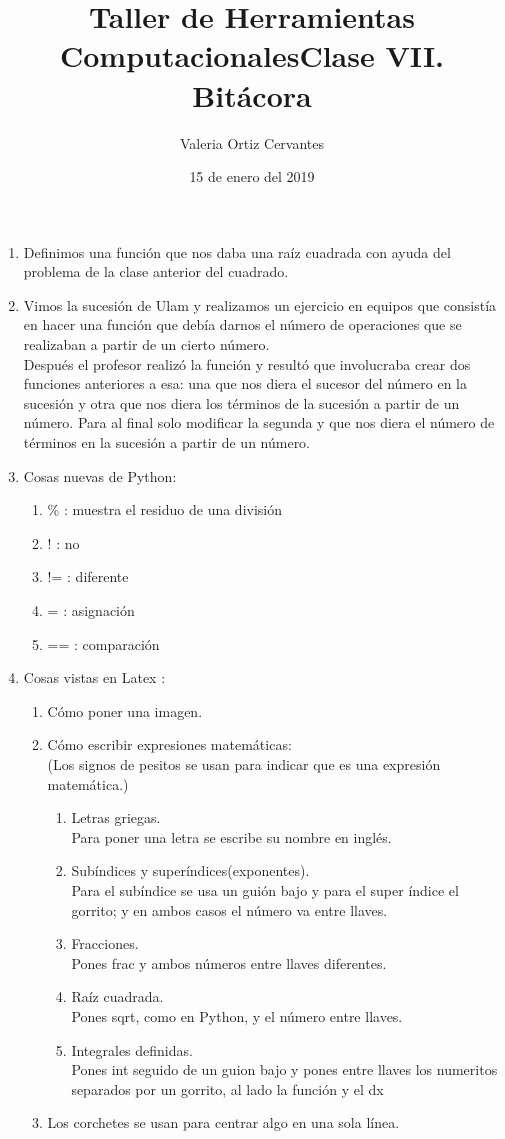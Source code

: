 \documentclass{article}
\title{\Huge Taller de Herramientas Computacionales}
\author{Valeria Ortiz Cervantes}
\date{15 de enero del 2019}
\begin{document}
	\maketitle
	\newpage
	\title{Clase VII. Bitácora\\}
	\begin{enumerate}
		\item Definimos una función que nos daba una raíz cuadrada con ayuda del problema de la clase anterior del cuadrado.
		\item Vimos la sucesión  de Ulam y realizamos un ejercicio en equipos que consistía en hacer una función que debía darnos el número de operaciones que se realizaban a partir de un cierto número. \\ Después el profesor realizó la función y resultó que involucraba crear dos funciones anteriores a esa: una que nos diera el sucesor del número en la sucesión y otra que nos diera los términos de la sucesión a partir de un número. Para al final solo modificar la segunda y que nos diera el número de términos en la sucesión a partir de un número.
		\item Cosas nuevas de Python:
		\begin{enumerate}
			\item \% : muestra el residuo de una división
			\item ! : no 
			\item != : diferente 
			\item = : asignación
			\item == : comparación 
		\end{enumerate}
		\item Cosas vistas en Latex :
		\begin{enumerate}
			\item Cómo poner una imagen.
			\item Cómo escribir expresiones matemáticas:\\(Los signos de pesitos se usan para indicar que es una expresión matemática.)
			\begin{enumerate}
				\item Letras griegas.\\Para poner una letra se escribe su nombre en inglés.
				\item Subíndices y superíndices(exponentes).\\Para el subíndice se usa un guión bajo y para el super índice el gorrito; y en ambos casos el número va entre llaves.
				\item Fracciones.\\Pones frac y ambos números entre llaves diferentes.
				\item Raíz cuadrada.\\Pones sqrt, como en Python, y el número entre llaves.
				\item Integrales definidas.\\Pones int seguido de un guion bajo y pones entre llaves los numeritos separados por un gorrito, al lado la función y el dx
			\end{enumerate}
			\item Los corchetes se usan para centrar algo en una sola línea.
		\end{enumerate}
	\end{enumerate}
\end{document}
